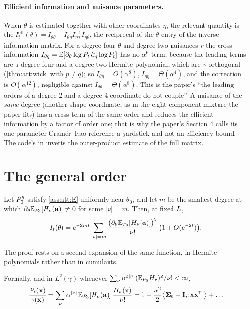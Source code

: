 \paragraph{Efficient information and nuisance parameters.}
When $\theta$ is estimated together with other coordinates $\eta$, the relevant
quantity is the 
$I^{\mathrm{eff}}_t(\theta)=I_{\theta\theta}-I_{\theta\eta}I_{\eta\eta}^{-1}I_{\eta\theta}$,
the reciprocal of the $\theta$-entry of the inverse information matrix. For a
degree-four $\theta$ and degree-two nuisances $\eta$ the cross information
$I_{\theta\eta}=\mathbb{E}[\partial_\theta\log P_t\,\partial_\eta\log P_t]$ has no $\alpha^6$ term,
because the leading terms are a degree-four and a degree-two Hermite polynomial,
which are $\gamma$-orthogonal (\cref{thm:att:wick} with $p\ne q$); so
$I_{\theta\eta}=O(\alpha^8)$, $I_{\eta\eta}=\Theta(\alpha^4)$, and the correction is
$O(\alpha^{12})$, negligible against $I_{\theta\theta}=\Theta(\alpha^8)$. This is the
paper's ``the leading orders of a degree-2 and a degree-4 coordinate do not couple''.
A nuisance of the \emph{same} degree (another shape coordinate, as in the
eight-component mixture the paper fits) has a cross term of the same order and
reduces the efficient information by a factor of order one; that is why the paper's
Section 4 calls its one-parameter Cram\'er--Rao reference a yardstick and not an
efficiency bound. The code's  in
 inverts the outer-product estimate of the
full matrix.

\section{The general order}
\label{sec:att:general}

\begin{theorem}
\label{thm:att:general}
Let $P_0^\theta$ satisfy \cref{ass:att:E} uniformly near $\theta_0$, and let $m$ be the
smallest degree at which $\partial_\theta\mathbb{E}_{P_0}[H_\nu(\mathbf{a})]\ne0$ for some $|\nu|=m$.
Then, at fixed $L$,
\[
  I_t(\theta)=e^{-2mt}\sum_{|\nu|=m}\frac{\bigl(\partial_\theta\mathbb{E}_{P_0}[H_\nu(\mathbf{a})]\bigr)^2}{\nu!}\,\bigl(1+O(e^{-2t})\bigr).
\]
\end{theorem}

The proof rests on a second expansion of the same function, in Hermite polynomials
rather than in cumulants.

\begin{lemma}
\label{lem:att:mehlerkernel}
Formally, and in $L^2(\gamma)$ whenever $\sum_\nu\alpha^{2|\nu|}(\mathbb{E}_{P_0}H_\nu)^2/\nu!<\infty$,
\begin{equation}
  \frac{\Pt(\vx)}{\gamma(\vx)}=\sum_{\nu}\alpha^{|\nu|}\,\E_{\Pz}[H_\nu(\va)]\,\frac{H_\nu(\vx)}{\nu!}
  =1+\frac{\alpha^2}2\bigl\langle\Sig_0-\Id,{:}\vx\vx^{\!\top}{:}\bigr\rangle+\dots
  \label{eq:att:mehlerkernel}
\end{equation}
\end{lemma}

